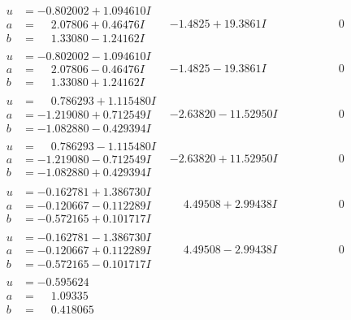 \documentclass[1p]{elsarticle_modified}
\theoremstyle{definition}
\begin{document}
$$\begin{array}{c|c|c}
\begin{aligned}
u &= -0.802002 + 1.094610 I \\
a &= \phantom{-}2.07806 + 0.46476 I \\
b &= \phantom{-}1.33080 - 1.24162 I\end{aligned}
 & -1.4825 + 19.3861 I & \phantom{-0.000000 } 0 \\ \hline\begin{aligned}
u &= -0.802002 - 1.094610 I \\
a &= \phantom{-}2.07806 - 0.46476 I \\
b &= \phantom{-}1.33080 + 1.24162 I\end{aligned}
 & -1.4825 - 19.3861 I & \phantom{-0.000000 } 0 \\ \hline\begin{aligned}
u &= \phantom{-}0.786293 + 1.115480 I \\
a &= -1.219080 + 0.712549 I \\
b &= -1.082880 - 0.429394 I\end{aligned}
 & -2.63820 - 11.52950 I & \phantom{-0.000000 } 0 \\ \hline\begin{aligned}
u &= \phantom{-}0.786293 - 1.115480 I \\
a &= -1.219080 - 0.712549 I \\
b &= -1.082880 + 0.429394 I\end{aligned}
 & -2.63820 + 11.52950 I & \phantom{-0.000000 } 0 \\ \hline\begin{aligned}
u &= -0.162781 + 1.386730 I \\
a &= -0.120667 - 0.112289 I \\
b &= -0.572165 + 0.101717 I\end{aligned}
 & \phantom{-}4.49508 + 2.99438 I & \phantom{-0.000000 } 0 \\ \hline\begin{aligned}
u &= -0.162781 - 1.386730 I \\
a &= -0.120667 + 0.112289 I \\
b &= -0.572165 - 0.101717 I\end{aligned}
 & \phantom{-}4.49508 - 2.99438 I & \phantom{-0.000000 } 0 \\ \hline\begin{aligned}
u &= -0.595624\phantom{ +0.000000I} \\
a &= \phantom{-}1.09335\phantom{ +0.000000I} \\
b &= \phantom{-}0.418065\phantom{ +0.000000I}\end{aligned}

\end{array}$$
\end{document}
